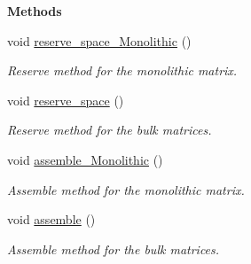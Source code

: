 \begin{Indent}{\bf Methods}\par
\begin{DoxyCompactItemize}
\item 
void \hyperlink{classFVCode3D_1_1global__BulkBuilder_a4f1cfa8e5e8dff81e56993a7ecf9485d}{reserve\+\_\+space\+\_\+\+Monolithic} ()
\begin{DoxyCompactList}\small\item\em Reserve method for the monolithic matrix. \end{DoxyCompactList}\item 
void \hyperlink{classFVCode3D_1_1global__BulkBuilder_a39e4c88b8703afc8a9f058301a9cb61a}{reserve\+\_\+space} ()
\begin{DoxyCompactList}\small\item\em Reserve method for the bulk matrices. \end{DoxyCompactList}\item 
void \hyperlink{classFVCode3D_1_1global__BulkBuilder_ae68449982a79f46851040949df45306c}{assemble\+\_\+\+Monolithic} ()
\begin{DoxyCompactList}\small\item\em Assemble method for the monolithic matrix. \end{DoxyCompactList}\item 
void \hyperlink{classFVCode3D_1_1global__BulkBuilder_acf5c2ccba1be5c8ba2165587503c83b9}{assemble} ()
\begin{DoxyCompactList}\small\item\em Assemble method for the bulk matrices. \end{DoxyCompactList}\end{DoxyCompactItemize}
\end{Indent}
